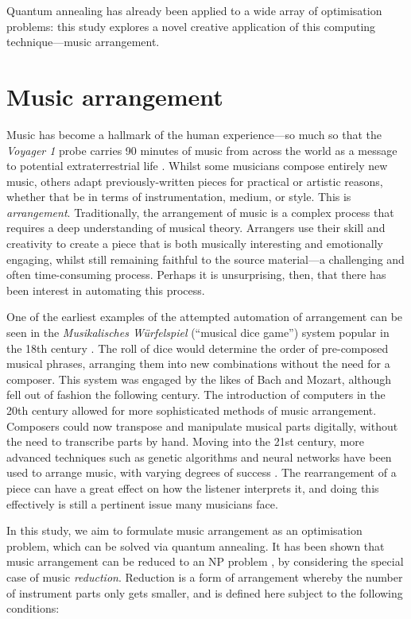 \documentclass[12pt]{article}
\theoremstyle{definition}
\begin{document}
Quantum annealing has already been applied to a wide array of optimisation problems: this study explores a novel creative application of this computing technique---music arrangement.

\section{Music arrangement}
\label{sec:arrangement}

Music has become a hallmark of the human experience---so much so that the \textit{Voyager 1} probe carries 90 minutes of music from across the world as a message to potential extraterrestrial life \cite{nasa_golden_2024}. Whilst some musicians compose entirely new music, others adapt previously-written pieces for practical or artistic reasons, whether that be in terms of instrumentation, medium, or style. This is \emph{arrangement}.
Traditionally, the arrangement of music is a complex process that requires a deep understanding of musical theory. Arrangers use their skill and creativity to create a piece that is both musically interesting and emotionally engaging, whilst still remaining faithful to the source material---a challenging and often time-consuming process. Perhaps it is unsurprising, then, that there has been interest in automating this process.

One of the earliest examples of the attempted automation of arrangement can be seen in the \textit{Musikalisches Würfelspiel} (``musical dice game'') system popular in the 18th century \cite{nierhaus_algorithmic_2009}. The roll of dice would determine the order of pre-composed musical phrases, arranging them into new combinations without the need for a composer. This system was engaged by the likes of Bach and Mozart, although fell out of fashion the following century.
The introduction of computers in the 20th century allowed for more sophisticated methods of music arrangement. Composers could now transpose and manipulate musical parts digitally, without the need to transcribe parts by hand. Moving into the 21st century, more advanced techniques such as genetic algorithms and neural networks have been used to arrange music, with varying degrees of success \cite{nierhaus_algorithmic_2009}. The rearrangement of a piece can have a great effect on how the listener interprets it, and doing this effectively is still a pertinent issue many musicians face. 

In this study, we aim to formulate music arrangement as an optimisation problem, which can be solved via quantum annealing. It has been shown that music arrangement can be reduced to an NP problem \cite{moses_computational_2016}, by considering the special case of music \emph{reduction}. Reduction is a form of arrangement whereby the number of instrument parts only gets smaller, and is defined here subject to the following conditions:
\end{document}
